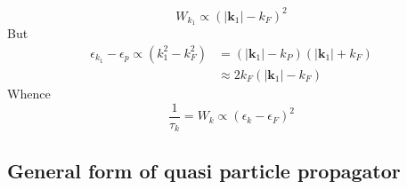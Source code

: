 \begin{equation}W_{k_{1}} \propto\left(\left|\mathbf{k}_{1}\right|-k_{F}\right)^{2}\end{equation}
But
\begin{equation}\begin{aligned}
\epsilon_{k_{1}}-\epsilon_{p} \propto\left(k_{1}^{2}-k_{F}^{2}\right) &=\left(\left|\mathbf{k}_{1}\right|-k_{P}\right)\left(\left|\mathbf{k}_{1}\right|+k_{F}\right) \\
& \approx 2 k_{F}\left(\left|\mathbf{k}_{1}\right|-k_{F}\right)
\end{aligned}\end{equation}
Whence
\begin{equation}\frac{1}{\tau_{k}}=W_{k} \propto\left(\epsilon_{k}-\epsilon_{F}\right)^{2}\end{equation}

\subsection{General form of quasi particle propagator}